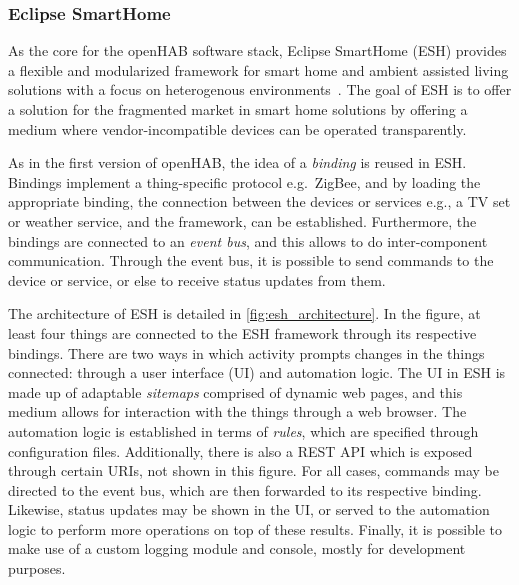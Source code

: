 \documentclass[12pt]{article}
\begin{document}
\subsubsection{Eclipse SmartHome}

As the core for the openHAB software stack, Eclipse SmartHome (ESH) provides a flexible and modularized framework for smart home and ambient assisted living solutions with a focus on heterogenous environments~\cite{esh_01}. The goal of ESH is to offer a solution for the fragmented market in smart home solutions by offering a medium where vendor-incompatible devices can be operated transparently.

As in the first version of openHAB, the idea of a \emph{binding} is reused in ESH. Bindings implement a thing-specific protocol e.g.\ ZigBee, and by loading the appropriate binding, the connection between the devices or services e.g., a TV set or weather service, and the framework, can be established. Furthermore, the bindings are connected to an \emph{event bus}, and this allows to do inter-component communication. Through the event bus, it is possible to send commands to the device or service, or else to receive status updates from them.

The architecture of ESH is detailed in \autoref{fig:esh_architecture}. In the figure, at least four things are connected to the ESH framework through its respective bindings. There are two ways in which activity prompts changes in the things connected: through a user interface (UI) and automation logic. The UI in ESH is made up of adaptable \emph{sitemaps} comprised of dynamic web pages, and this medium allows for interaction with the things through a web browser. The automation logic is established in terms of \emph{rules}, which are specified through configuration files. Additionally, there is also a REST API which is exposed through certain URIs, not shown in this figure. For all cases, commands may be directed to the event bus, which are then forwarded to its respective binding. Likewise, status updates may be shown in the UI, or served to the automation logic to perform more operations on top of these results. Finally, it is possible to make use of a custom logging module and console, mostly for development purposes.
\end{document}
